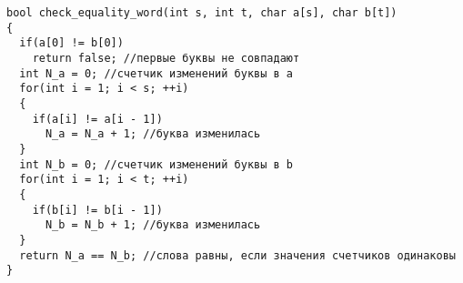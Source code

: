 \documentclass[a5paper]{article}
\begin{document}

\begin{lstlisting}
bool check_equality_word(int s, int t, char a[s], char b[t])
{
  if(a[0] != b[0])
    return false; //первые буквы не совпадают
  int N_a = 0; //счетчик изменений буквы в a
  for(int i = 1; i < s; ++i)
  {
    if(a[i] != a[i - 1])
      N_a = N_a + 1; //буква изменилась
  }
  int N_b = 0; //счетчик изменений буквы в b
  for(int i = 1; i < t; ++i)
  {
    if(b[i] != b[i - 1])
      N_b = N_b + 1; //буква изменилась
  }
  return N_a == N_b; //слова равны, если значения счетчиков одинаковы
}
\end{lstlisting}
\end{document}
